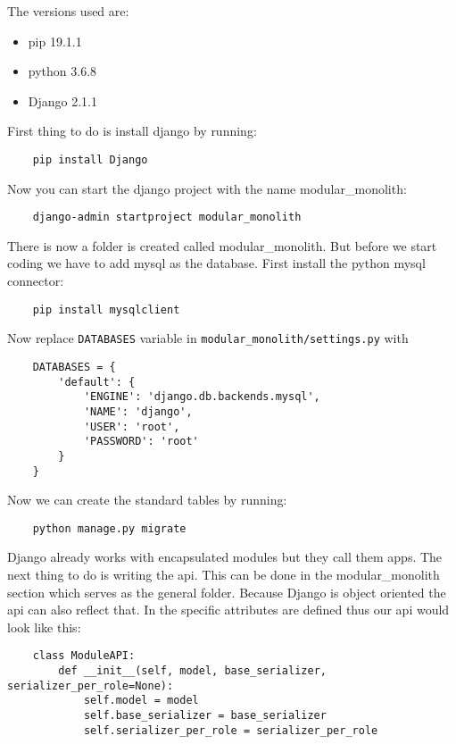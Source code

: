 The versions used are:
\begin{itemize}
  \item pip 19.1.1
  \item python 3.6.8
  \item Django 2.1.1
\end{itemize}

First thing to do is install django by running:
\begin{verbatim}
    pip install Django
\end{verbatim}

Now you can start the django project with the name modular\_monolith:
\begin{verbatim}
    django-admin startproject modular_monolith
\end{verbatim}

There is now a folder is created called modular\_monolith. But before we start coding we have to add mysql as the database. First install the python mysql connector:
\begin{verbatim}
    pip install mysqlclient
\end{verbatim}

Now replace \texttt{DATABASES} variable in \texttt{modular\_monolith/settings.py} with
\begin{verbatim}
    DATABASES = {
        'default': {
            'ENGINE': 'django.db.backends.mysql',
            'NAME': 'django',
            'USER': 'root',
            'PASSWORD': 'root'
        }
    }
\end{verbatim}

Now we can create the standard tables by running:
\begin{verbatim}
    python manage.py migrate
\end{verbatim}

Django already works with encapsulated modules but they call them apps. The next thing to do is writing the api. This can be done in the modular\_monolith section which serves as the general folder. Because Django is object oriented the api can also reflect that. In  the specific attributes are defined thus our api would look like this:
\begin{verbatim}
    class ModuleAPI:
        def __init__(self, model, base_serializer, serializer_per_role=None):
            self.model = model
            self.base_serializer = base_serializer
            self.serializer_per_role = serializer_per_role
\end{verbatim}

